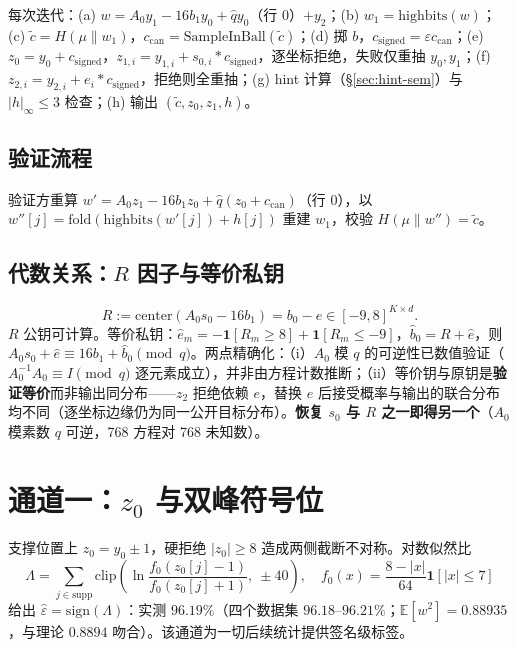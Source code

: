 \documentclass[11pt,a4paper]{ctexart}
\newcommand{\modq}{\pmod q}
\begin{document}
每次迭代：(a) $w = A_0 y_1 - 16 b_1 y_0 + \hat q y_0$（行 0）$+ y_2$；(b) $w_1 = \mathrm{highbits}(w)$；(c) $\tilde c = H(\mu\|w_1)$，$c_{\mathrm{can}} = \mathrm{SampleInBall}(\tilde c)$；(d) 掷 $b$，$c_{\mathrm{signed}} = \varepsilon c_{\mathrm{can}}$；(e) $z_0 = y_0 + c_{\mathrm{signed}}$，$z_{1,i} = y_{1,i} + s_{0,i}*c_{\mathrm{signed}}$，逐坐标拒绝，失败仅重抽 $y_0,y_1$；(f) $z_{2,i} = y_{2,i} + e_i*c_{\mathrm{signed}}$，拒绝则全重抽；(g) hint 计算（\S\ref{sec:hint-sem}）与 $|h|_\infty\le3$ 检查；(h) 输出 $(\tilde c, z_0, z_1, h)$。

\subsection{验证流程}

验证方重算 $w' = A_0 z_1 - 16 b_1 z_0 + \hat q(z_0 + c_{\mathrm{can}})$（行 0），以 $w''[j] = \mathrm{fold}(\mathrm{highbits}(w'[j]) + h[j])$ 重建 $w_1$，校验 $H(\mu\|w'') = \tilde c$。

\subsection{代数关系：$R$ 因子与等价私钥}\label{sec:algebra}

\begin{equation}
R := \mathrm{center}(A_0 s_0 - 16 b_1) = b_0 - e \in [-9,8]^{K\times d}.
\label{eq:Rdef}
\end{equation}
$R$ 公钥可计算。等价私钥：$\hat e_m = -\mathbf{1}[R_m\ge8] + \mathbf{1}[R_m\le-9]$，$\hat b_0 = R + \hat e$，则 $A_0 s_0 + \hat e \equiv 16 b_1 + \hat b_0 \modq$。两点精确化：（i）$A_0$ 模 $q$ 的可逆性已数值验证（$A_0^{-1}A_0 \equiv I \pmod q$ 逐元素成立），并非由方程计数推断；（ii）等价钥与原钥是\textbf{验证等价}而非输出同分布——$z_2$ 拒绝依赖 $e$，替换 $\hat e$ 后接受概率与输出的联合分布均不同（逐坐标边缘仍为同一公开目标分布）。\textbf{恢复 $s_0$ 与 $R$ 之一即得另一个}（$A_0$ 模素数 $q$ 可逆，768 方程对 768 未知数）。

\section{通道一：$z_0$ 与双峰符号位}\label{sec:z0}

支撑位置上 $z_0 = y_0 \pm 1$，硬拒绝 $|z_0|\ge8$ 造成两侧截断不对称。对数似然比
\begin{equation}
\Lambda = \sum_{j\in\mathrm{supp}} \mathrm{clip}\!\left(\ln\frac{f_0(z_0[j]-1)}{f_0(z_0[j]+1)},\ \pm40\right),
\quad f_0(x) = \frac{8-|x|}{64}\mathbf{1}[|x|\le7]
\label{eq:Lambda}
\end{equation}
给出 $\hat\varepsilon = \mathrm{sign}(\Lambda)$：实测 $96.19\%$（四个数据集 $96.18$--$96.21\%$；$\mathbb{E}[w^2] = 0.88935$，与理论 $0.8894$ 吻合）。该通道为一切后续统计提供签名级标签。
\end{document}
